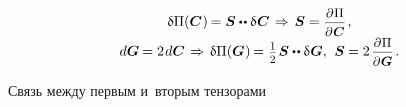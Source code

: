 \begin{otherlanguage}{russian}
\nopagebreak\vspace{-0.4em}\begin{equation}
\begin{array}{c}
\variation{\Pi}(\bm{C}\hspace{.1ex}) \hspace{-0.2ex} = \secondpiolakirchhoffstress \dotdotp \variation{\hspace{.1ex} \bm{C}}
\hspace{.25ex} \Rightarrow \hspace{.32ex}
\secondpiolakirchhoffstress = \scalebox{0.92}{$ \displaystyle \frac{\partial \hspace{.1ex} \Pi}{\raisemath{-0.1em}{\partial \hspace{.1ex} \bm{C}}} $} \hspace{.24ex} , \\[.5em]
%
d\bm{G} \hspace{-0.12ex} = 2 \hspace{.2ex} d \bm{C}
\hspace{.25ex} \Rightarrow \hspace{.32ex}
\variation{\Pi}(\bm{G}\hspace{.1ex}) \hspace{-0.2ex} = \hspace{.1ex} \smalldisplaystyleonehalf \hspace{.2ex} \secondpiolakirchhoffstress \dotdotp \variation{\hspace{.1ex} \bm{G}} ,
\:\,
\secondpiolakirchhoffstress \hspace{-0.1ex} = 2 \hspace{.25ex} \scalebox{0.92}{$ \displaystyle \frac{\partial \hspace{.1ex} \Pi}{\raisemath{-0.1em}{\partial \hspace{.1ex} \bm{G}}} $} \hspace{.25ex}.
\end{array}
\end{equation}

Связь между первым и~вторым тензорами


\end{otherlanguage}
